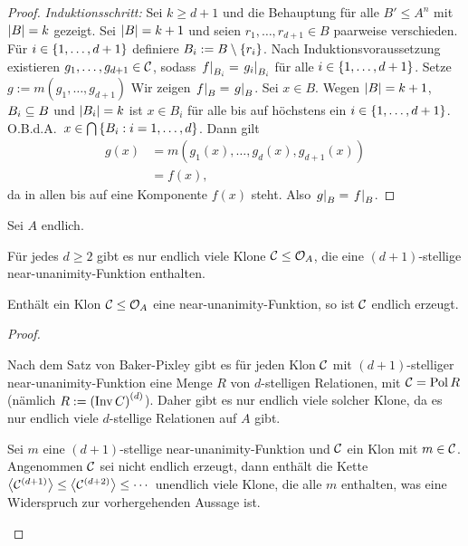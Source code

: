 \documentclass{book}
\begin{document}
\begin{proof}
\emph{Induktionsschritt:} Sei $k\geq d+1$ und die Behauptung für alle $B'\leq A^n$ mit $\left|B\right|=k$ gezeigt. Sei $\left|B\right| = k+1$ und seien $r_1,\ldots,r_{d+1}\in B$ paarweise verschieden. Für $i\in\left\{1,\ldots,d+1\right\}$ definiere $B_i:=B\setminus\left\{r_i\right\}$. Nach Induktionsvoraussetzung existieren $g_1,\ldots,g_{d+1}\in\mathcal{C}$, sodass $\left. f\right\vert_{B_i}=\left. g_i\right\vert_{B_i}$ für alle $i\in\left\{1,\ldots,d+1\right\}$. Setze $g:=m(g_1,\ldots,g_{d+1})$ Wir zeigen $\left. f\right\vert_B=\left. g\right\vert_{B}$. Sei $x\in B$. Wegen $\left|B\right| = k+1$, $B_i\subseteq B$ und $\left|B_i\right| = k$ ist $x\in B_i$ für alle bis auf höchstens ein $i\in\left\{1,\ldots,d+1\right\}$.
O.B.d.A.~$x\in \bigcap\left\{B_i:i=1,\ldots,d\right\}$. Dann gilt
\begin{align*}
    g(x) &= m(g_1(x),\ldots,g_d(x),g_{d+1}(x))\\
    &= f(x),
\end{align*}
da in allen bis auf eine Komponente $f(x)$ steht. Also $\left. g\right\vert_B=\left. f\right\vert_B$.
\end{proof}

\begin{corollary}
    Sei $A$ endlich.
    \begin{statements}
            \item Für jedes $d\geq 2$ gibt es nur endlich viele Klone $\mathcal{C}\leq \mathcal{O}_A$, die eine $(d+1)$-stellige near-unanimity-Funktion enthalten.
            \item Enthält ein Klon $\mathcal{C}\leq \mathcal{O}_A$ eine near-unanimity-Funktion, so ist $\mathcal{C}$ endlich erzeugt.
    \end{statements}
\end{corollary}

\begin{proof}
    \begin{statements}
            \item Nach dem Satz von Baker-Pixley gibt es für jeden Klon $\mathcal{C}$ mit $(d+1)$-stelliger near-unanimity-Funktion eine Menge $R$ von $d$-stelligen Relationen, mit $\mathcal{C}=\mathop\mathrm{Pol} R$ (nämlich $R:={(\mathop\mathrm{Inv} C)}^{(d)}$). Daher gibt es nur endlich viele solcher Klone, da es nur endlich viele $d$-stellige Relationen auf $A$ gibt.
            \item Sei $m$ eine $(d+1)$-stellige near-unanimity-Funktion und $\mathcal{C}$ ein Klon mit $m\in\mathcal{C}$. Angenommen $\mathcal{C}$ sei nicht endlich erzeugt, dann enthält die Kette $\gen{\cC^{(d+1)}}\leq \gen{\cC^{(d+2)}} \leq \cdots$ unendlich viele Klone, die alle $m$ enthalten, was eine Widerspruch zur vorhergehenden Aussage ist.
    \end{statements}
\end{proof}
\end{document}

